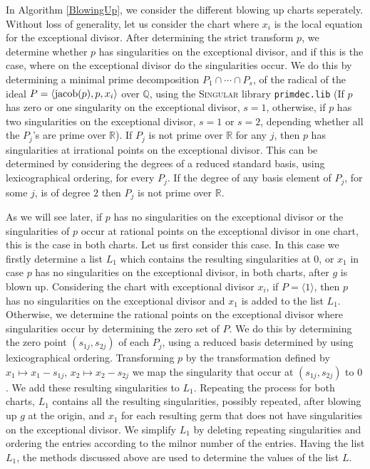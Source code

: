 \documentclass[noend]{amsproc}
\begin{document}
In Algorithm \ref{BlowingUp}, we consider the different blowing up charts
seperately. Without loss of generality, let us consider the chart where $x_i$
is the local equation for the exceptional divisor. After determining the strict
transform $p$, we determine whether $p$ has singularities on the exceptional
divisor, and if this is the case, where on the exceptional divisor do the
singularities occur. We do this by determining a minimal prime decomposition
$P_1\cap\cdots\cap P_s$, of the radical of the ideal $P=\langle
\textnormal{jacob}(p),p,x_i\rangle$ over $\mathbb Q$, using the \textsc{Singular}
library {\tt primdec.lib} \cite{primdec.lib} (If $p$ has zero or one singularity
on the exceptional divisor, $s=1$, otherwise, if $p$ has two singularities on
the exceptional divisor, $s=1$ or $s=2$, depending whether all the $P_j$'s are
prime over $\mathbb R$).  If $P_j$ is not prime over $\mathbb R$ for any $j$,
then $p$ has singularities at irrational points on the exceptional divisor.
This can be determined by considering the degrees of a reduced standard basis,
using lexicographical ordering, for every $P_j$. If the degree of any basis
element of $P_j$, for some $j$, is of degree $2$ then $P_j$ is not prime over
$\mathbb R$.

As we will see later, if $p$ has no singularities on the exceptional divisor or the
singularities of $p$ occur at rational points on the exceptional divisor in one
chart, this is the case in both charts. Let us first consider this case.
In this case we firstly determine a list $L_1$ which contains the resulting
singularities at $0$, or $x_1$ in case $p$ has no singularities on the exceptional divisor, 
in both charts, after $g$ is blown up. Considering the chart with
exceptional divisor $x_i$, if $P=\langle 1\rangle$, then $p$ has no singularities on the
exceptional divisor and $x_1$ is added to the list $L_1$. Otherwise, we determine the
rational points on the exceptional divisor where singularities occur by
determining the zero set of $P$. We do this by determining the zero point
$(s_{1j},s_{2j})$ of each $P_j$, using a reduced basis determined by using
lexicographical ordering. Transforming $p$ by the transformation defined by
$x_1\mapsto x_1-s_{1j}$, $x_2\mapsto x_2-s_{2j}$ we map the singularity that
occur at  $(s_{1j},s_{2j})$ to $0$. We add these resulting singularities to
$L_1$. Repeating the process for both charts, $L_1$ contains all the resulting
singularities, possibly repeated, after blowing up $g$ at the origin, and $x_1$
for each resulting germ that does not have singularities on the exceptional divisor. We
simplify $L_1$ by deleting repeating singularities and ordering the entries
according to the milnor number of the entries. Having the list $L_1$, the
methods discussed above are used to determine the values of the list $L$.
\end{document}
